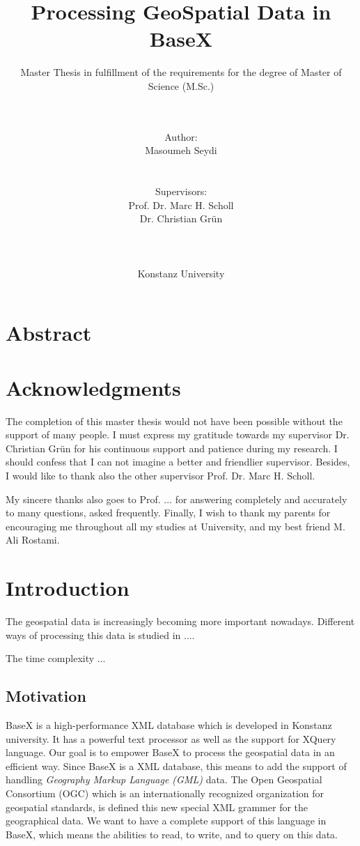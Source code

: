 \documentclass[a4paper,12pt]{article}
\title{Processing GeoSpatial Data in BaseX}
\subtitle{Master Thesis in fulfillment of the requirements for the degree of
Master of Science (M.Sc.)}
\author{\\\\Author: \\
	Masoumeh Seydi
	\\\\\\Supervisors: \\
	Prof. Dr. Marc H. Scholl \\ 
	Dr. Christian Gr{\"u}n \\
	\\\\\\
	Konstanz University}
\begin{document}
\maketitle
\thispagestyle{empty}

\newpage
\section*{Abstract}

\thispagestyle{empty}

\newpage
\section*{Acknowledgments}
\thispagestyle{empty}

The completion of this master thesis would not have been possible 
without the support of many people. 
I must express my gratitude towards my supervisor 
Dr. Christian Gr{\"u}n for his continuous support and patience during my research.
I should confess that I can not imagine a better and friendlier
supervisor. Besides, I would like to thank also the other supervisor
Prof. Dr. Marc H. Scholl.

My sincere thanks also goes to Prof. ...  for
answering completely and accurately to many questions, asked
frequently. Finally, I wish to thank my parents for encouraging me 
throughout all my studies at University, and my best friend M. Ali Rostami.


\newpage
\tableofcontents

\thispagestyle{empty}
\newpage
\section{Introduction}
\setcounter{page}{1}
The geospatial data is increasingly becoming more important nowadays.
Different ways of processing this data is studied in ....

The time complexity ...

\subsection{Motivation}
BaseX is a high-performance XML database which is developed in Konstanz university.
It has a powerful text processor as well as the support for XQuery language.
Our goal is to empower BaseX to process the geospatial data in an efficient way.
Since BaseX is a XML database, this means to add the support of handling 
\emph{Geography Markup Language (GML)} data. The Open Geospatial Consortium (OGC)
which is an internationally recognized organization for geospatial standards,
is defined this new special XML grammer for the geographical data.
We want to have a complete support of this language in BaseX,
which means the abilities to read, to write, and to query on this data.
\end{document}
